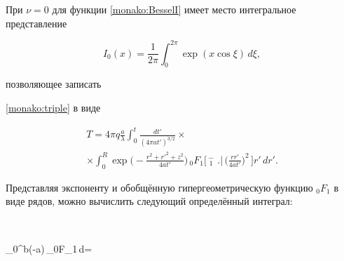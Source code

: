 \newpage



При $\nu=0$  для функции \eqref{monako:BesselI} имеет место \cite{manako:abramovits} интегральное представление 

$$I_0(x)=\frac{1}{2\pi}\int _0^{2\pi}\exp(x\cos \xi)\,d\xi,$$

позволяющее записать






\eqref{monako:triple} в виде 

\begin{multline}

\label{monako:double}

T=4\pi q\frac{a}{\lambda}\int _0^t\frac{dt'}{(4 \pi at')^{3/2}} \times \\ \times  \int _0^R\exp\bigg(-\frac{r^2+r'^2+z^2}{4at'}\bigg)\,_{0}F_{1}\Bigg[\,^{\displaystyle -}_{\displaystyle \,1}\,\,\bigg.\bigg|\,\bigg(\frac{rr'}{4at'}\bigg)^2\,\Bigg] r'\,dr'.

\end{multline}

Представляя экспоненту и обобщённую гипергеометрическую функцию $ _0F_1 $ в виде рядов, можно вычислить следующий определённый интеграл:

$$


\int _0^b\exp(-a\xi)\,_{0}F_{1}\,d\xi=



